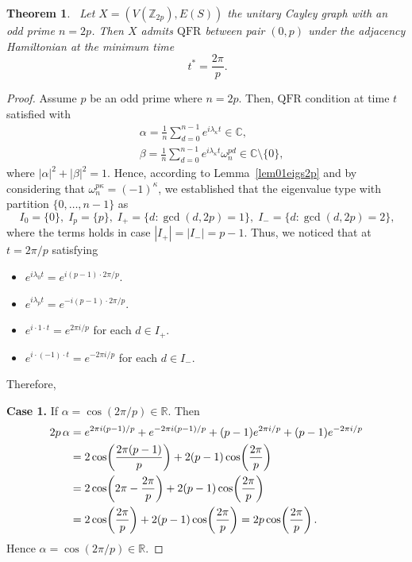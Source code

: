 \documentclass[12pt]{amsart}
\newtheorem{theorem}{Theorem}[section]
\newcommand{\QFR}{\mathrm{QFR}}
\begin{document}
\begin{theorem}~\label{Thm2revivaltime}
Let $X = (V(\mathbb{Z}_{2p}), E(S))$ the unitary Cayley graph with an odd prime $n=2p$. Then $X$ admits $\QFR$ between pair $(0, p)$ under the adjacency Hamiltonian at the
  minimum time
\begin{equation}~\label{eqq1Thm2revivaltime}
 t^* = \frac{2\pi}{p}.
\end{equation}
\end{theorem}
\begin{proof}
Assume $p$ be an odd prime where $n=2p$. Then, $\QFR$ condition at time $t$ satisfied with 
  \begin{equation}~\label{eqq2Thm2revivaltime}
  \begin{aligned}
&\alpha = \frac{1}{n}\sum_{d=0}^{n-1} e^{i\lambda_{\kappa} t} \in \mathbb{C},\\
& \beta  = \frac{1}{n}\sum_{d=0}^{n-1} e^{i\lambda_{\kappa} t}\omega_n^{pd} \in \mathbb{C}\setminus\{0\},
  \end{aligned}
  \end{equation}
  where $|\alpha|^2 + |\beta|^2 = 1.$ Hence, according to Lemma~\ref{lem01eigs2p} and by considering that $\omega_n^{p\kappa}=(-1)^{\kappa}$, we established  that the eigenvalue type with partition $\{0, \ldots, n-1\}$ as
  \begin{equation}~\label{eqq3Thm2revivaltime}
   I_0 = \{0\},\; I_p = \{p\},\; I_+ = \{d : \gcd(d,2p)=1\},\; I_- = \{d : \gcd(d,2p)=2\},      
  \end{equation}
  where the terms holds in case $|I_+|=|I_-|=p-1$. Thus, we noticed that at $t = 2\pi/p$ satisfying 
  \begin{itemize}
    \item $e^{i\lambda_0 t} = e^{i(p-1)\cdot 2\pi/p}$.
    \item $e^{i\lambda_p t} = e^{-i(p-1)\cdot 2\pi/p}$.
    \item $e^{i\cdot 1 \cdot t} = e^{2\pi i/p}$ for each $d \in I_+$.
    \item $e^{i\cdot(-1)\cdot t} = e^{-2\pi i/p}$ for each $d \in I_-$.
  \end{itemize}
Therefore, 

\textbf{Case 1.} If $\alpha = \cos(2\pi/p) \in \mathbb{R}$. Then
  \begin{align*}
    2p\,\alpha &= e^{2\pi i(p-1)/p} + e^{-2\pi i(p-1)/p}
                 + (p-1)e^{2\pi i/p} + (p-1)e^{-2\pi i/p} \notag\\
               &= 2\cos\!\left(\frac{2\pi(p-1)}{p}\right) + 2(p-1)\cos\!\left(\frac{2\pi}{p}\right)\notag\\
               &= 2\cos\!\left(2\pi - \frac{2\pi}{p}\right) + 2(p-1)\cos\!\left(\frac{2\pi}{p}\right)\notag\\
               &= 2\cos\!\left(\frac{2\pi}{p}\right) + 2(p-1)\cos\!\left(\frac{2\pi}{p}\right)
                = 2p\cos\!\left(\frac{2\pi}{p}\right).
  \end{align*}
  Hence $\alpha = \cos(2\pi/p) \in \mathbb{R}$. 


\end{proof}
\end{document}
